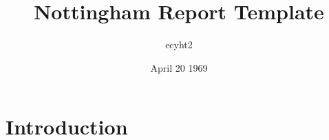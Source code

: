 \documentclass{article}
\title{Nottingham Report Template}
\author{ecyht2}
\date{April 20 1969}
\begin{document}
\maketitle

\section{Introduction}
\end{document}

